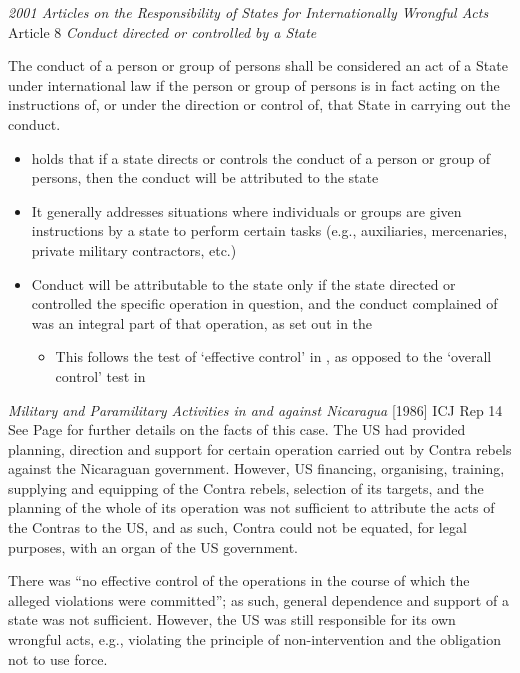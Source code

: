 \begin{conventiondetails}{\textit{2001 Articles on the Responsibility of States for Internationally Wrongful Acts} Article 8}
    \flushleft
    \textit{Conduct directed or controlled by a State}

    \vspace{\baselineskip}

    The conduct of a person or group of persons shall be considered an act of a State under international law if the person or group of persons is in fact acting on the instructions of, or under the direction or control of, that State in carrying out the conduct.
\end{conventiondetails}

\begin{itemize}
    \item {} holds that if a state directs or controls the conduct of a person or group of persons, then the conduct will be attributed to the state
    \item It generally addresses situations where individuals or groups are given instructions by a state to perform certain tasks (e.g., auxiliaries, mercenaries, private military contractors, etc.)
    \item Conduct will be attributable to the state only if the state directed or controlled the specific operation in question, and the conduct complained of was an integral part of that operation, as set out in the 
    \begin{itemize}
        \item This follows the test of `effective control' in , as opposed to the `overall control' test in 
    \end{itemize}
\end{itemize}

\begin{casedetails}{\textit{Military and Paramilitary Activities in and against Nicaragua} [1986] ICJ Rep 14}
    \flushleft
    See Page \pageref{case:Military and paramilitary activities in Nicaragua} for further details on the facts of this case. The US had provided planning, direction and support for certain operation carried out by Contra rebels against the Nicaraguan government. However, US financing, organising, training, supplying and equipping of the Contra rebels, selection of its targets, and the planning of the whole of its operation was not sufficient to attribute the acts of the Contras to the US, and as such, Contra could not be equated, for legal purposes, with an organ of the US government.

    \vspace{\baselineskip}

    There was ``no effective control of the operations in the course of which the alleged violations were committed''; as such, general dependence and support of a state was not sufficient. However, the US was still responsible for its own wrongful acts, e.g., violating the principle of non-intervention and the obligation not to use force.
\end{casedetails}

